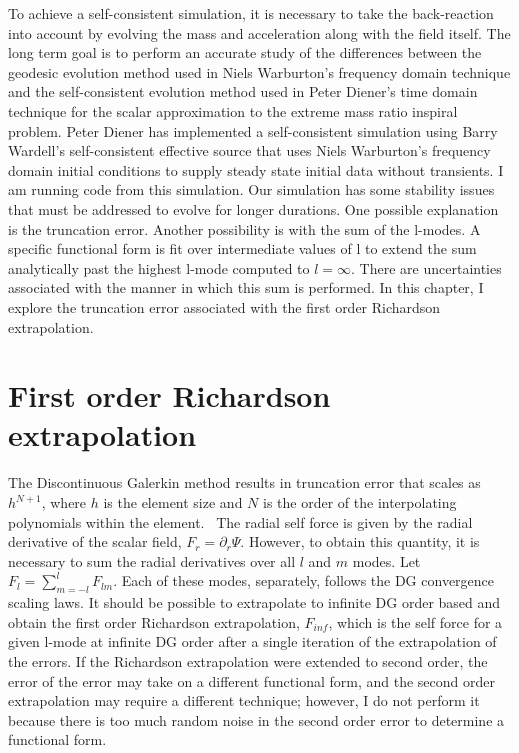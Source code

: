 To achieve a self-consistent simulation, it is necessary to take the back-reaction into account by evolving the mass and acceleration along with the field itself. The long term goal is to perform an accurate study of the differences between the geodesic evolution method used in Niels Warburton's frequency domain technique and the self-consistent evolution method used in Peter Diener's time domain technique for the scalar approximation to the extreme mass ratio inspiral problem. Peter Diener has implemented a self-consistent simulation using Barry Wardell's self-consistent effective source that uses Niels Warburton's frequency domain initial conditions to supply steady state initial data without transients. I am running code from this simulation. Our simulation has some stability issues that must be addressed to evolve for longer durations. One possible explanation is the truncation error. Another possibility is with the sum of the l-modes. A specific functional form is fit over intermediate values of l to extend the sum analytically past the highest l-mode computed to $l=\infty$. There are uncertainties associated with the manner in which this sum is performed. In this chapter, I explore the truncation error associated with the first order Richardson extrapolation.

\section{First order Richardson extrapolation}

The Discontinuous Galerkin method results in truncation error that scales as $h^{N+1}$, where $h$ is the element size and $N$ is the order of the interpolating polynomials within the element.~\cite{dghesthaven} The radial self force is given by the radial derivative of the scalar field, $F_r=\partial_r\Psi$. However, to obtain this quantity, it is necessary to sum the radial derivatives over all $l$ and $m$ modes. Let $F_l=\sum_{m=-l}^l F_{lm}$. Each of these modes, separately, follows the DG convergence scaling laws. It should be possible to extrapolate to infinite DG order based and obtain the first order Richardson extrapolation, $F_{inf}$, which is the self force for a given l-mode at infinite DG order after a single iteration of the extrapolation of the errors. If the Richardson extrapolation were extended to second order, the error of the error may take on a different functional form, and the second order extrapolation may require a different technique; however, I do not perform it because there is too much random noise in the second order error to determine a functional form.

